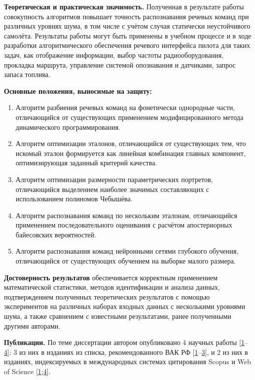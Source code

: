 \textbf{Теоретическая и практическая значимость.}
Полученная в результате работы совокупность алгоритмов повышает точность распознавания речевых команд при различных уровнях шума, в том числе с учётом случая статически неустойчивого самолёта.
Результаты работы могут быть применены в учебном процессе и в ходе разработки алгоритмического обеспечения речевого интерфейса пилота для таких задач, как отображение информации, выбор частоты радиооборудования, прокладка маршрута, управление системой опознавания и датчиками, запрос запаса топлива.

\textbf{Основные положения, выносимые на защиту:}
\begin{enumerate}[label={\arabic*)}]
	\item Алгоритм разбиения речевых команд на фонетически однородные части, отличающийся от существующих применением модифицированного метода динамического программирования.
	\item Алгоритм оптимизации эталонов, отличающийся от существующих тем, что искомый эталон формируется как линейная комбинация главных компонент, оптимизирующая заданный критерий качества.
	\item Алгоритм оптимизации размерности параметрических портретов, отличающийся выделением наиболее значимых составляющих с использованием полиномов Чебышёва.
	\item Алгоритм распознавания команд по нескольким эталонам, отличающийся применением последовательного оценивания с расчётом апостериорных байесовских вероятностей.
	\item Алгоритм распознавания команд нейронными сетями глубокого обучения, отличающийся от существующих обучением на выборке малого размера.
\end{enumerate}

\textbf{Достоверность результатов} обеспечивается корректным применением математической статистики, методов идентификации и анализа данных, подтверждением полученных теоретических результатов с помощью экспериментов на различных наборах входных данных с несколькими уровнями шума, а также сравнением с известными результатами, ранее полученными другими авторами.

\textbf{Публикации.}
По теме диссертации автором опубликовано 4 научных работы [\hyperref[korsun2016automatic]{1}--\hyperref[korsun2018optimal]{4}]: 3 из них в изданиях из списка, рекомендованного ВАК РФ [\hyperref[korsun2016automatic]{1}--\hyperref[korsun2018usage]{3}], и 2 из них в изданиях, индексируемых в международных системах цитирования Scopus и Web of Science [\hyperref[korsun2016automatic]{1};\hyperref[korsun2018optimal]{4}].


